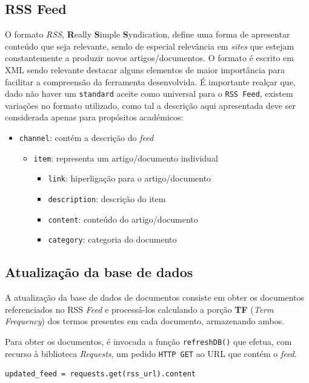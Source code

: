 \documentclass{article}
\begin{document}
\subsection{RSS Feed}
\label{rss_format}
O formato \textit{RSS}, \textbf{R}eally \textbf{S}imple \textbf{S}yndication, define uma forma de apresentar conteúdo que seja relevante, sendo de especial relevância
em \textit{sites} que estejam constantemente a produzir novos artigos/documentos. 
O formato é escrito em XML sendo relevante destacar alguns elementos de maior importância para facilitar a compreensão da ferramenta desenvolvida.
É importante realçar que, dado não haver um \texttt{standard} aceite como universal para o \texttt{RSS Feed}, existem variações no formato utilizado, como tal
a descrição aqui apresentada deve ser considerada apenas para propósitos académicos:
\begin{itemize}
    \item \texttt{channel}: contém a descrição do \textit{feed}
    \begin{itemize}
        \item \texttt{item}: representa um artigo/documento individual
        \begin{itemize}
            \item \texttt{link}: hiperligação para o artigo/documento
            \item \texttt{description}: descrição do item
            \item \texttt{content}: conteúdo do artigo/documento
            \item \texttt{category}: categoria do documento
        \end{itemize}
    \end{itemize}
\end{itemize}


\subsection{Atualização da base de dados}
A atualização da base de dados de documentos consiste em obter os documentos referenciados no RSS \textit{Feed} e processá-los calculando a porção \textbf{TF} (\textit{Term Frequency}) dos termos presentes em cada documento, armazenando ambos.

Para obter os documentos, é invocada a função \texttt{refreshDB()} que efetua, com recurso à biblioteca \textit{Requests}, um pedido \texttt{HTTP GET} ao URL que contém 
o \textit{feed}.

\begin{verbatim}
updated_feed = requests.get(rss_url).content 
\end{verbatim}
\end{document}
